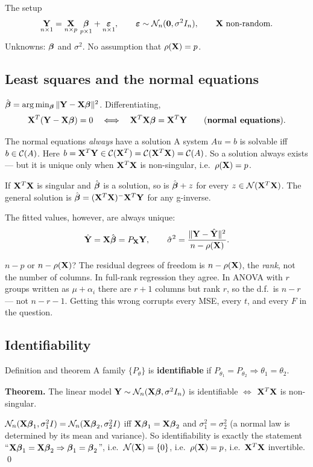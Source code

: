 \documentclass[11pt]{article}
\begin{document}
\begin{idea}{The setup}
\[
  \underset{n\times1}{\mathbf{Y}}=\underset{n\times p}{\mathbf{X}}\ \underset{p\times1}{\boldsymbol{\beta}}+\underset{n\times1}{\boldsymbol{\varepsilon}},
  \qquad \boldsymbol{\varepsilon}\sim \mathcal{N}_n(\mathbf{0},\sigma^2 I_n),\qquad \mathbf{X} \text{ non-random}.
\]
Unknowns: $\boldsymbol{\beta}$ and $\sigma^2$. No assumption that $\rho(\mathbf{X})=p$.
\end{idea}

\subsection{Least squares and the normal equations}

$\hat{\boldsymbol{\beta}} = \arg\min_{\boldsymbol{\beta}}\|\mathbf{Y}-\mathbf{X}\boldsymbol{\beta}\|^2$. Differentiating,
\[
  \mathbf{X}^T(\mathbf{Y}-\mathbf{X}\boldsymbol{\beta})=0 \quad\Longleftrightarrow\quad \mathbf{X}^T\mathbf{X}\boldsymbol{\beta}=\mathbf{X}^T\mathbf{Y}
  \qquad\text{(\textbf{normal equations}).}
\]

\begin{idea}{The normal equations \emph{always} have a solution}
A system $Au=b$ is solvable iff $b\in\mathcal{C}(A)$. Here $b=\mathbf{X}^T\mathbf{Y}\in\mathcal{C}(\mathbf{X}^T)=\mathcal{C}(\mathbf{X}^T\mathbf{X})=\mathcal{C}(A)$.
So a solution always exists --- but it is unique only when $\mathbf{X}^T\mathbf{X}$ is non-singular, i.e.\
$\rho(\mathbf{X})=p$.
\end{idea}

If $\mathbf{X}^T\mathbf{X}$ is singular and $\hat{\boldsymbol{\beta}}$ is a solution, so is $\hat{\boldsymbol{\beta}}+z$ for every
$z\in\mathcal{N}(\mathbf{X}^T\mathbf{X})$. The general solution is $\hat{\boldsymbol{\beta}}=(\mathbf{X}^T\mathbf{X})^-\mathbf{X}^T\mathbf{Y}$ for any
g-inverse.

The fitted values, however, are always unique:
\[
  \hat{\mathbf{Y}}=\mathbf{X}\hat{\boldsymbol{\beta}}=P_{\mathbf{X}}\mathbf{Y},\qquad
  \hat\sigma^2=\frac{\|\mathbf{Y}-\hat{\mathbf{Y}}\|^2}{n-\rho(\mathbf{X})} .
\]

\begin{confusion}{$n-p$ or $n-\rho(\mathbf{X})$?}
The residual degrees of freedom is $n-\rho(\mathbf{X})$, the \emph{rank}, not the number of columns.
In full-rank regression they agree. In ANOVA with $r$ groups written as $\mu+\alpha_i$ there
are $r+1$ columns but rank $r$, so the d.f.\ is $n-r$ --- not $n-r-1$. Getting this wrong
corrupts every MSE, every $t$, and every $F$ in the question.
\end{confusion}

\subsection{Identifiability}

\begin{idea}{Definition and theorem}
A family $\{P_\theta\}$ is \textbf{identifiable} if $P_{\theta_1}=P_{\theta_2}\Rightarrow\theta_1=\theta_2$.

\textbf{Theorem.} The linear model $\mathbf{Y}\sim\mathcal{N}_n(\mathbf{X}\boldsymbol{\beta},\sigma^2 I_n)$ is identifiable
$\iff$ $\mathbf{X}^T\mathbf{X}$ is non-singular.
\end{idea}
\prf $\mathcal{N}_n(\mathbf{X}\boldsymbol{\beta}_1,\sigma_1^2I)=\mathcal{N}_n(\mathbf{X}\boldsymbol{\beta}_2,\sigma_2^2I)$ iff $\mathbf{X}\boldsymbol{\beta}_1=\mathbf{X}\boldsymbol{\beta}_2$ and
$\sigma_1^2=\sigma_2^2$ (a normal law is determined by its mean and variance). So
identifiability is exactly the statement ``$\mathbf{X}\boldsymbol{\beta}_1=\mathbf{X}\boldsymbol{\beta}_2\Rightarrow\boldsymbol{\beta}_1=\boldsymbol{\beta}_2$'',
i.e.\ $\mathcal{N}(\mathbf{X})=\{0\}$, i.e.\ $\rho(\mathbf{X})=p$, i.e.\ $\mathbf{X}^T\mathbf{X}$ invertible. \qed
\end{document}
